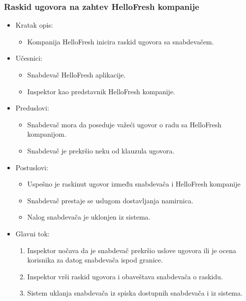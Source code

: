 \subsubsection{Raskid ugovora na zahtev HelloFresh kompanije}

\begin{itemize}
    \item Kratak opis:
        \begin{itemize}
            \item Kompanija HelloFresh inicira raskid ugovora sa snabdevačem.
        \end{itemize}
    \item Učesnici:
        \begin{itemize}
            \item Snabdevač HelloFresh aplikacije.
            \item Inspektor kao predstavnik HelloFresh kompanije.
        \end{itemize}
    \item Preduslovi:
        \begin{itemize}
            \item Snabdevač mora da poseduje važeći ugovor o radu sa HelloFresh kompanijom.
            \item Snabdevač je prekršio neku od klauzula ugovora.
        \end{itemize}
    \item Postuslovi:
        \begin{itemize}
            \item Uspešno je raskinut ugovor između snabdevača i HelloFresh kompanije
            \item Snabdevač prestaje se uslugom dostavljanja namirnica.
            \item Nalog snabdevača je uklonjen iz sistema.
        \end{itemize}
    \item Glavni tok:
        \begin{enumerate}
            \item Inspektor uočava da je snabdevač prekršio uslove ugovora ili je ocena korisnika za datog snabdevača ispod granice.
            \item Inspektor vrši raskid ugovora i obaveštava snabdevača o raskidu.
            \item Sistem uklanja snabdevača iz spiska dostupnih snabdevača i iz sistema.
        \end{enumerate}
\end{itemize}